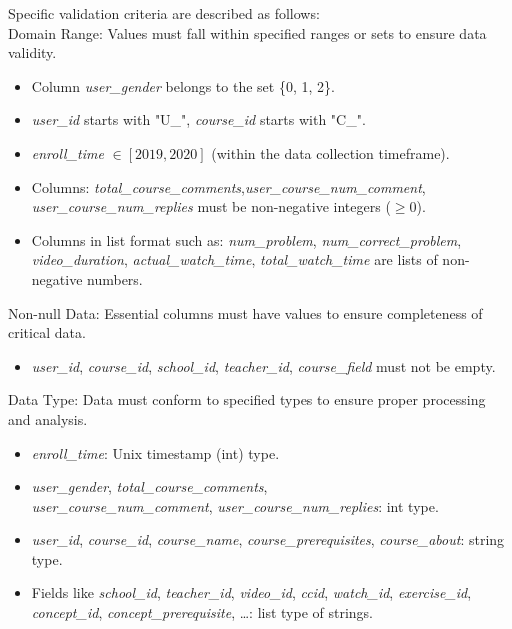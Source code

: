 \documentclass{ieeeaccess}
\begin{document}
Specific validation criteria are described as follows:\\
Domain Range: Values must fall within specified ranges or sets to ensure data validity.

\begin{itemize}
    \item Column \textit{user\_gender} belongs to the set \{0, 1, 2\}.
    \item \textit{user\_id} starts with "U\_", \textit{course\_id} starts with "C\_".
    \item \textit{enroll\_time} $\in [2019, 2020]$ (within the data collection timeframe).
    \item Columns: \textit{total\_course\_comments},\linebreak \textit{user\_course\_num\_comment}, \textit{user\_course\_num\_replies} must be non-negative integers ($\ge 0$).
    \item Columns in list format such as: \textit{num\_problem}, \textit{num\_correct\_problem}, \textit{video\_duration}, \linebreak\textit{actual\_watch\_time}, \textit{total\_watch\_time} are lists of non-negative numbers.
\end{itemize}

Non-null Data: Essential columns must have values to ensure completeness of critical data.
\begin{itemize}
    \item \textit{user\_id}, \textit{course\_id}, \textit{school\_id}, \textit{teacher\_id}, \textit{course\_field} must not be empty.
\end{itemize}

Data Type: Data must conform to specified types to ensure proper processing and analysis.
\begin{itemize}
    \item \textit{enroll\_time}: Unix timestamp (int) type.
    \item \textit{user\_gender}, \textit{total\_course\_comments}, \\\textit{user\_course\_num\_comment}, \textit{user\_course\_num\_replies}: int type.
    \item \textit{user\_id}, \textit{course\_id}, \textit{course\_name}, \textit{course\_prerequisites}, \textit{course\_about}: string type.
    \item Fields like \textit{school\_id}, \textit{teacher\_id}, \textit{video\_id}, \textit{ccid}, \textit{watch\_id}, \textit{exercise\_id}, \textit{concept\_id}, \textit{concept\_prerequisite}, \dots: list type of strings.
\end{itemize}
\end{document}
